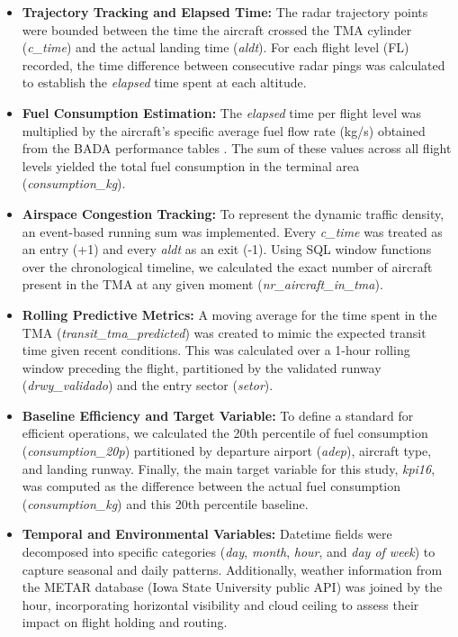 \begin{itemize}
    \item \textbf{Trajectory Tracking and Elapsed Time:} The radar trajectory points were bounded between the time the aircraft crossed the TMA cylinder (\textit{c\_time}) and the actual landing time (\textit{aldt}). For each flight level (FL) recorded, the time difference between consecutive radar pings was calculated to establish the \textit{elapsed} time spent at each altitude.
    
    \item \textbf{Fuel Consumption Estimation:} The \textit{elapsed} time per flight level was multiplied by the aircraft's specific average fuel flow rate (kg/s) obtained from the BADA performance tables \cite{bada_a320, pybada}. The sum of these values across all flight levels yielded the total fuel consumption in the terminal area (\textit{consumption\_kg}).
    
    \item \textbf{Airspace Congestion Tracking:} To represent the dynamic traffic density, an event-based running sum was implemented. Every \textit{c\_time} was treated as an entry (+1) and every \textit{aldt} as an exit (-1). Using SQL window functions over the chronological timeline, we calculated the exact number of aircraft present in the TMA at any given moment (\textit{nr\_aircraft\_in\_tma}).
    
    \item \textbf{Rolling Predictive Metrics:} A moving average for the time spent in the TMA (\textit{transit\_tma\_predicted}) was created to mimic the expected transit time given recent conditions. This was calculated over a 1-hour rolling window preceding the flight, partitioned by the validated runway (\textit{drwy\_validado}) and the entry sector (\textit{setor}).
    
    \item \textbf{Baseline Efficiency and Target Variable:} To define a standard for efficient operations, we calculated the 20th percentile of fuel consumption (\textit{consumption\_20p}) partitioned by departure airport (\textit{adep}), aircraft type, and landing runway. Finally, the main target variable for this study, \textit{kpi16}, was computed as the difference between the actual fuel consumption (\textit{consumption\_kg}) and this 20th percentile baseline.
    
    \item \textbf{Temporal and Environmental Variables:} Datetime fields were decomposed into specific categories (\textit{day}, \textit{month}, \textit{hour}, and \textit{day of week}) to capture seasonal and daily patterns. Additionally, weather information from the METAR database (Iowa State University public API) was joined by the hour, incorporating horizontal visibility and cloud ceiling to assess their impact on flight holding and routing.
\end{itemize}

